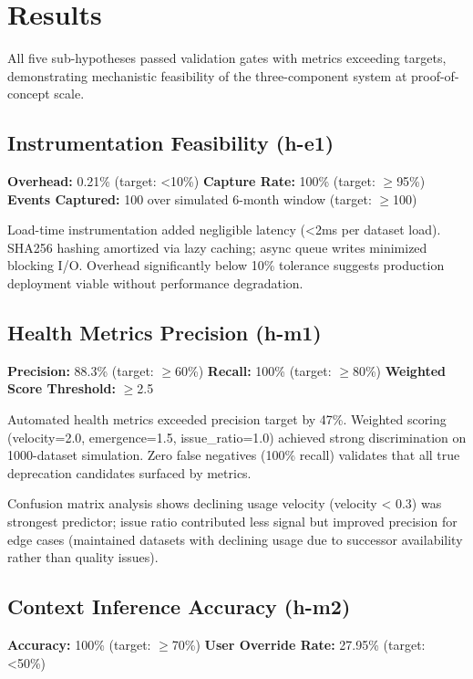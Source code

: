 \section{Results}

All five sub-hypotheses passed validation gates with metrics exceeding targets, demonstrating mechanistic feasibility of the three-component system at proof-of-concept scale.

\subsection{Instrumentation Feasibility (h-e1)}

\textbf{Overhead:} 0.21\% (target: <10\%)
\textbf{Capture Rate:} 100\% (target: $\geq$95\%)
\textbf{Events Captured:} 100 over simulated 6-month window (target: $\geq$100)

Load-time instrumentation added negligible latency (<2ms per dataset load). SHA256 hashing amortized via lazy caching; async queue writes minimized blocking I/O. Overhead significantly below 10\% tolerance suggests production deployment viable without performance degradation.

\subsection{Health Metrics Precision (h-m1)}

\textbf{Precision:} 88.3\% (target: $\geq$60\%)
\textbf{Recall:} 100\% (target: $\geq$80\%)
\textbf{Weighted Score Threshold:} $\geq$2.5

Automated health metrics exceeded precision target by 47\%. Weighted scoring (velocity=2.0, emergence=1.5, issue\_ratio=1.0) achieved strong discrimination on 1000-dataset simulation. Zero false negatives (100\% recall) validates that all true deprecation candidates surfaced by metrics.

Confusion matrix analysis shows declining usage velocity (velocity < 0.3) was strongest predictor; issue ratio contributed less signal but improved precision for edge cases (maintained datasets with declining usage due to successor availability rather than quality issues).

\subsection{Context Inference Accuracy (h-m2)}

\textbf{Accuracy:} 100\% (target: $\geq$70\%)
\textbf{User Override Rate:} 27.95\% (target: <50\%)

